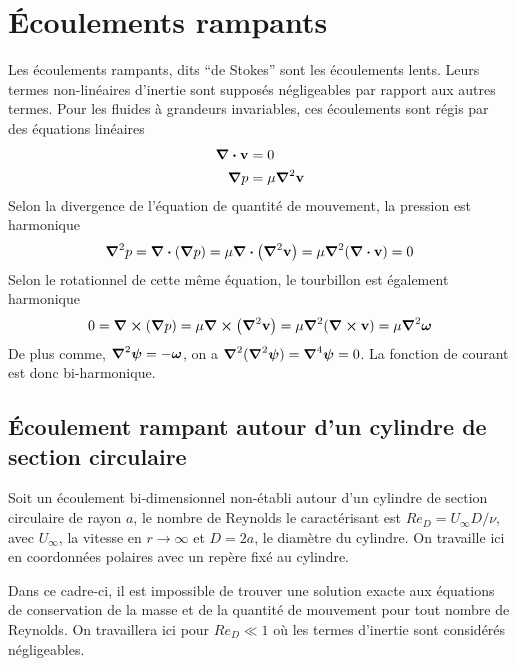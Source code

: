 
\chapter{Écoulements rampants}
  Les écoulements rampants, dits ``de Stokes'' sont les écoulements lents. Leurs termes non-linéaires d'inertie sont supposés négligeables par rapport aux autres termes. Pour les fluides à grandeurs invariables, ces écoulements sont régis par des équations linéaires
  \begin{equation}
    \begin{aligned}
      \div \vb{v} &= 0\\
      \grad p &= \mu \grad^2 \vb{v}
    \end{aligned}
  \end{equation}
  Selon la divergence de l'équation de quantité de mouvement, la pression est harmonique
  \begin{equation}
    \grad^2 p = \div (\grad p) = \mu \div (\grad^2 \vb{v}) = \mu \grad^2(\div \vb{v}) = 0
  \end{equation}
  Selon le rotationnel de cette même équation, le tourbillon est également harmonique
  \begin{equation}
    0 = \curl(\grad p) = \mu \curl (\grad^2 \vb{v}) = \mu \grad^2 (\curl \vb{v}) = \mu \grad^2 \boldsymbol{\omega}
  \end{equation}
  De plus comme, $\grad^2 \boldsymbol{\psi} = -\boldsymbol{\omega}$, on a $\grad^2(\grad^2 \boldsymbol{\psi}) = \grad^4 \boldsymbol{\psi}= 0$. La fonction de courant est donc bi-harmonique.

  \section{Écoulement rampant autour d'un cylindre de section circulaire}
    Soit un écoulement bi-dimensionnel non-établi autour d'un cylindre de section circulaire de rayon $a$, le nombre de Reynolds le caractérisant est $Re_D = U_{\infty}D/\nu$, avec $U_{\infty}$, la vitesse en $r\rightarrow\infty$ et $D = 2a$, le diamètre du cylindre. On travaille ici en coordonnées polaires avec un repère fixé au cylindre.

    Dans ce cadre-ci, il est impossible de trouver une solution exacte aux équations de conservation de la masse et de la quantité de mouvement pour tout nombre de Reynolds. On travaillera ici pour $Re_D \ll 1$ où les termes d'inertie sont considérés négligeables.

